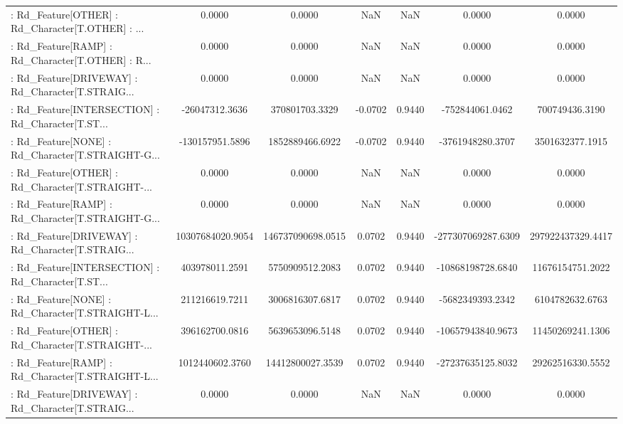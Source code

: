 \begin{longtable}{p{4cm}cccccc}
 : Rd\_Feature[OTHER] : Rd\_Character[T.OTHER] : ... &            0.0000 &            0.0000 &     NaN &          NaN &             0.0000 &            0.0000 \\
 : Rd\_Feature[RAMP] : Rd\_Character[T.OTHER] : R... &            0.0000 &            0.0000 &     NaN &          NaN &             0.0000 &            0.0000 \\
 : Rd\_Feature[DRIVEWAY] : Rd\_Character[T.STRAIG... &            0.0000 &            0.0000 &     NaN &          NaN &             0.0000 &            0.0000 \\
 : Rd\_Feature[INTERSECTION] : Rd\_Character[T.ST... &    -26047312.3636 &    370801703.3329 & -0.0702 &       0.9440 &    -752844061.0462 &    700749436.3190 \\
 : Rd\_Feature[NONE] : Rd\_Character[T.STRAIGHT-G... &   -130157951.5896 &   1852889466.6922 & -0.0702 &       0.9440 &   -3761948280.3707 &   3501632377.1915 \\
 : Rd\_Feature[OTHER] : Rd\_Character[T.STRAIGHT-... &            0.0000 &            0.0000 &     NaN &          NaN &             0.0000 &            0.0000 \\
 : Rd\_Feature[RAMP] : Rd\_Character[T.STRAIGHT-G... &            0.0000 &            0.0000 &     NaN &          NaN &             0.0000 &            0.0000 \\
 : Rd\_Feature[DRIVEWAY] : Rd\_Character[T.STRAIG... &  10307684020.9054 & 146737090698.0515 &  0.0702 &       0.9440 & -277307069287.6309 & 297922437329.4417 \\
 : Rd\_Feature[INTERSECTION] : Rd\_Character[T.ST... &    403978011.2591 &   5750909512.2083 &  0.0702 &       0.9440 &  -10868198728.6840 &  11676154751.2022 \\
 : Rd\_Feature[NONE] : Rd\_Character[T.STRAIGHT-L... &    211216619.7211 &   3006816307.6817 &  0.0702 &       0.9440 &   -5682349393.2342 &   6104782632.6763 \\
 : Rd\_Feature[OTHER] : Rd\_Character[T.STRAIGHT-... &    396162700.0816 &   5639653096.5148 &  0.0702 &       0.9440 &  -10657943840.9673 &  11450269241.1306 \\
 : Rd\_Feature[RAMP] : Rd\_Character[T.STRAIGHT-L... &   1012440602.3760 &  14412800027.3539 &  0.0702 &       0.9440 &  -27237635125.8032 &  29262516330.5552 \\
 : Rd\_Feature[DRIVEWAY] : Rd\_Character[T.STRAIG... &            0.0000 &            0.0000 &     NaN &          NaN &             0.0000 &            0.0000 \\

\end{longtable}
